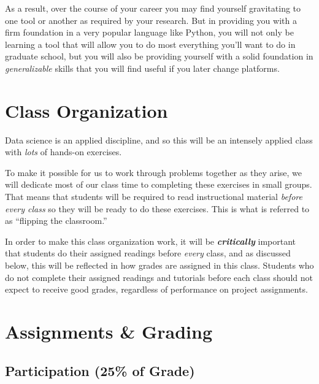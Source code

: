 \documentclass[12pt]{article}
\begin{document}
As a result, over the course of your career you may find yourself gravitating to one tool or another as required by your research. But in providing you with a firm foundation in a very popular language like Python, you will not only be learning a tool that will allow you to do most everything you'll want to do in graduate school, but you will also be providing yourself with a solid foundation in \emph{generalizable} skills that you will find useful if you later change platforms.

\section{Class Organization}

Data science is an applied discipline, and so this will be an intensely applied class with \emph{lots} of hands-on exercises.

To make it possible for us to work through problems together as they arise, we will dedicate most of our class time to completing these exercises in small groups. That means that students will be required to read instructional material \emph{before every class} so they will be ready to do these exercises. This is what is referred to as ``flipping the classroom.''

In order to make this class organization work, it will be \textbf{\emph{critically}} important that students do their assigned readings before \emph{every} class, and as discussed below, this will be reflected in how grades are assigned in this class. Students who do not complete their assigned readings and tutorials before each class should not expect to receive good grades, regardless of performance on project assignments.






\section{Assignments \& Grading}

\subsection{Participation (25\% of Grade)}
\end{document}
